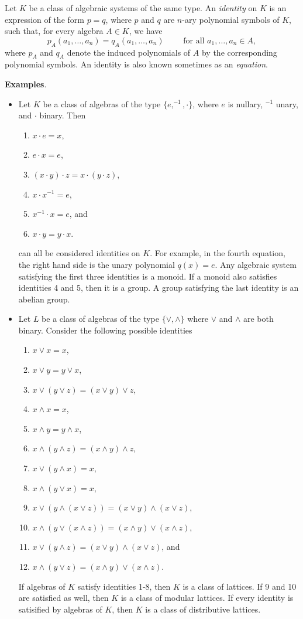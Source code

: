 \documentclass[12pt]{article}
\begin{document}
Let $K$ be a class of algebraic systems of the same type.  An \emph{identity} on $K$ is an expression of the form $p=q$, where $p$ and $q$ are $n$-ary polynomial symbols of $K$, such that, for every algebra $A\in K$, we have $$p_A(a_1,\ldots, a_n)=q_A(a_1,\ldots,a_n)\qquad\mbox{ for all }a_1,\ldots, a_n\in A,$$
where $p_A$ and $q_A$ denote the induced polynomials of $A$ by the corresponding polynomial symbols.  An identity is also known sometimes as an \emph{equation}.

\textbf{Examples}.
\begin{itemize}
\item Let $K$ be a class of algebras of the type $\lbrace e, ^{-1}, \cdot \rbrace$, where $e$ is nullary, $^{-1}$ unary, and $\cdot$ binary.  Then
\begin{enumerate}
\item $x\cdot e=x$,
\item $e\cdot x=e$,
\item $(x\cdot y)\cdot z=x\cdot (y\cdot z)$,
\item $x\cdot x^{-1}=e$,
\item $x^{-1}\cdot x=e$, and
\item $x\cdot y= y\cdot x$.
\end{enumerate}
can all be considered identities on $K$.  For example, in the fourth equation, the right hand side is the unary polynomial $q(x)=e$.  Any algebraic system satisfying the first three identities is a monoid.  If a monoid also satisfies identities 4 and 5, then it is a group.  A group satisfying the last identity is an abelian group.
\item Let $L$ be a class of algebras of the type $\lbrace \vee, \wedge \rbrace$ where $\vee$ and $\wedge$ are both binary.  Consider the following possible identities
\begin{enumerate}
\item $x\vee x=x$,
\item $x\vee y=y\vee x$,
\item $x\vee (y\vee z)=(x\vee y)\vee z$,
\item $x\wedge x=x$,
\item $x\wedge y=y\wedge x$,
\item $x\wedge (y\wedge z)=(x\wedge y)\wedge z$,
\item $x\vee (y\wedge x)=x$,
\item $x\wedge (y\vee x)=x$,
\item $x\vee (y\wedge (x\vee z))=(x\vee y)\wedge (x\vee z)$, 
\item $x\wedge (y\vee (x\wedge z))=(x\wedge y)\vee (x\wedge z)$,
\item $x\vee (y\wedge z)=(x\vee y)\wedge (x\vee z)$, and 
\item $x\wedge (y\vee z)=(x\wedge y)\vee (x\wedge z)$.
\end{enumerate}
If algebras of $K$ satisfy identities 1-8, then $K$ is a class of lattices.  If 9 and 10 are satisfied as well, then $K$ is a class of modular lattices.  If every identity is satisified by algebras of $K$, then $K$ is a class of distributive lattices.
\end{itemize}
\end{document}
